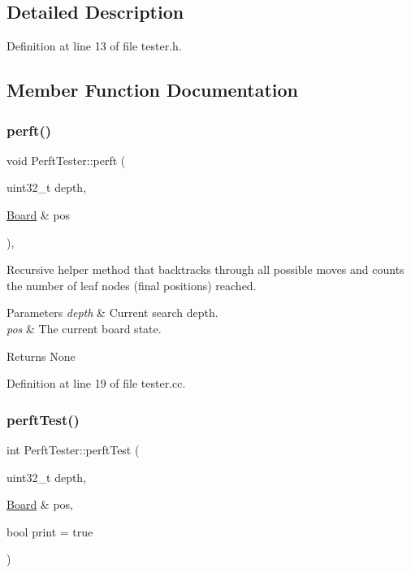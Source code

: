 \subsection{Detailed Description}


Definition at line 13 of file tester.\+h.



\subsection{Member Function Documentation}
\mbox{\label{classPerftTester_a7fa4c10a5d72fb37434da764d72ccd85}} 
\subsubsection{\texorpdfstring{perft()}{perft()}}
{\footnotesize\ttfamily void Perft\+Tester\+::perft (\begin{DoxyParamCaption}\item[{uint32\+\_\+t}]{depth,  }\item[{\mbox{\hyperlink{classBoard}{Board}} \&}]{pos }\end{DoxyParamCaption})\hspace{0.3cm}{\ttfamily [private]}, {\ttfamily [noexcept]}}



Recursive helper method that backtracks through all possible moves and counts the number of leaf nodes (final positions) reached. 


\begin{DoxyParams}{Parameters}
{\em depth} & Current search depth. \\
\hline
{\em pos} & The current board state. \\
\hline
\end{DoxyParams}
\begin{DoxyReturn}{Returns}
None 
\end{DoxyReturn}


Definition at line 19 of file tester.\+cc.

\mbox{\label{classPerftTester_aed268b09419b18b94d64a66a4bc9598f}} 
\subsubsection{\texorpdfstring{perft\+Test()}{perftTest()}}
{\footnotesize\ttfamily int Perft\+Tester\+::perft\+Test (\begin{DoxyParamCaption}\item[{uint32\+\_\+t}]{depth,  }\item[{\mbox{\hyperlink{classBoard}{Board}} \&}]{pos,  }\item[{bool}]{print = {\ttfamily true} }\end{DoxyParamCaption})\hspace{0.3cm}{\ttfamily [noexcept]}}

